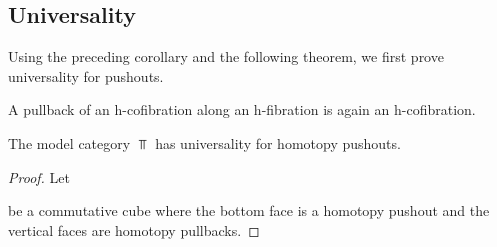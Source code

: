 \subsection*{Universality}
Using the preceding corollary and the following theorem, we first prove universality for pushouts.
\begin{thm}\label{thm:pbOfHcofibIsHcofib}
    A pullback of an h-cofibration along an h-fibration is again an h-cofibration.
    \begin{reference}
        \cite[Theorem 12]{note_on_cofibs_2}
    \end{reference}
\end{thm}
\begin{prop}\label{lem:topUniversalPo}
    The model category $\Top$ has universality for homotopy pushouts.
    \begin{proof}
        Let 
        \begin{center}
        \end{center}
        be a commutative cube where the bottom face is a homotopy pushout and the vertical faces are homotopy pullbacks.
        

\end{proof}
\end{prop}
